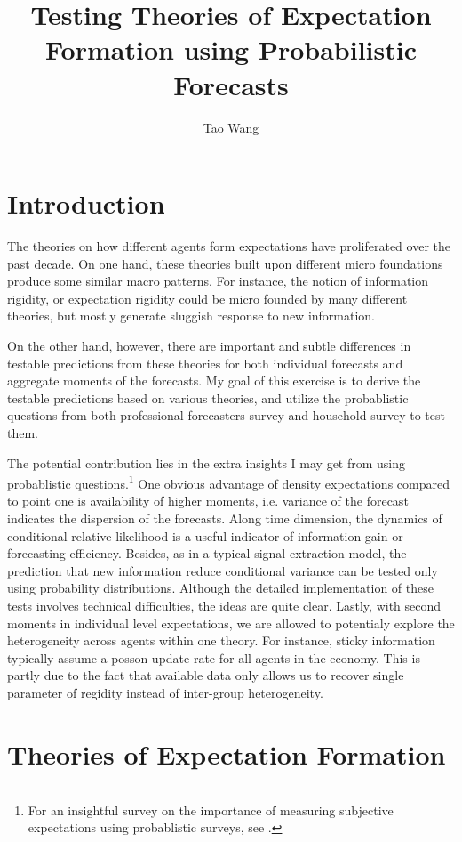 \documentclass[]{article}
\title{Testing Theories of Expectation Formation using Probabilistic Forecasts}
\author{Tao Wang}
\begin{document}
\maketitle

\section{Introduction}


The theories on how different agents form expectations have proliferated over the past decade. On one hand, these theories built upon different micro foundations produce some similar macro patterns. For instance, the notion of information rigidity, or expectation rigidity could be micro founded by many different theories, but mostly generate sluggish response to new information.  

On the other hand, however, there are important and subtle differences in testable predictions from these theories for both individual forecasts and aggregate moments of the forecasts. My goal of this exercise is to derive the testable predictions based on various theories, and utilize the probablistic questions from both professional forecasters survey and household survey to test them. 

The potential contribution lies in the extra insights I may get from using probablistic questions.\footnote{For an insightful survey on the importance of measuring subjective expectations using probablistic surveys, see \cite{manski2004measuring}.} One obvious advantage of density expectations compared to point one is availability of higher moments, i.e. variance of the forecast indicates the dispersion of the forecasts. Along time dimension, the dynamics of conditional relative likelihood is a useful indicator of information gain or forecasting efficiency. Besides, as in a typical signal-extraction model, the prediction that new information reduce conditional variance can be tested only using probability distributions. Although the detailed implementation of these tests involves technical difficulties, the ideas are quite clear.  Lastly, with second moments in individual level expectations, we are allowed to potentialy explore the heterogeneity across agents within one theory. For instance, sticky information typically assume a posson update rate for all agents in the economy. This is partly due to the fact that available data only allows us to recover single parameter of regidity instead of inter-group heterogeneity.  

\section{Theories of Expectation Formation}
\end{document}

